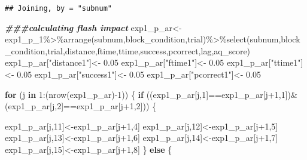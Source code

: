 \documentclass[
]{article}
\newenvironment{Shaded}{\begin{snugshade}}{\end{snugshade}}
\newcommand{\ControlFlowTok}[1]{\textcolor[rgb]{0.13,0.29,0.53}{\textbf{#1}}}
\newcommand{\DecValTok}[1]{\textcolor[rgb]{0.00,0.00,0.81}{#1}}
\newcommand{\DocumentationTok}[1]{\textcolor[rgb]{0.56,0.35,0.01}{\textbf{\textit{#1}}}}
\newcommand{\FloatTok}[1]{\textcolor[rgb]{0.00,0.00,0.81}{#1}}
\newcommand{\FunctionTok}[1]{\textcolor[rgb]{0.00,0.00,0.00}{#1}}
\newcommand{\NormalTok}[1]{#1}
\newcommand{\OtherTok}[1]{\textcolor[rgb]{0.56,0.35,0.01}{#1}}
\newcommand{\SpecialCharTok}[1]{\textcolor[rgb]{0.00,0.00,0.00}{#1}}
\newcommand{\StringTok}[1]{\textcolor[rgb]{0.31,0.60,0.02}{#1}}
\begin{document}
\begin{verbatim}
## Joining, by = "subnum"
\end{verbatim}

\begin{Shaded}
\begin{Highlighting}[]
\DocumentationTok{\#\#\#calculating flash impact}
\NormalTok{exp1\_p\_ar}\OtherTok{\textless{}{-}}\NormalTok{exp1\_p\_1}\SpecialCharTok{\%\textgreater{}\%}\FunctionTok{arrange}\NormalTok{(subnum,block\_condition,trial)}\SpecialCharTok{\%\textgreater{}\%}\FunctionTok{select}\NormalTok{(subnum,block\_condition,trial,distance,ftime,ttime,success,pcorrect,lag,aq\_score)}
\NormalTok{exp1\_p\_ar[}\StringTok{"distance1"}\NormalTok{]}\OtherTok{\textless{}{-}} \FloatTok{0.05}
\NormalTok{exp1\_p\_ar[}\StringTok{"ftime1"}\NormalTok{]}\OtherTok{\textless{}{-}} \FloatTok{0.05}
\NormalTok{exp1\_p\_ar[}\StringTok{"ttime1"}\NormalTok{]}\OtherTok{\textless{}{-}} \FloatTok{0.05}
\NormalTok{exp1\_p\_ar[}\StringTok{"success1"}\NormalTok{]}\OtherTok{\textless{}{-}} \FloatTok{0.05}
\NormalTok{exp1\_p\_ar[}\StringTok{"pcorrect1"}\NormalTok{]}\OtherTok{\textless{}{-}} \FloatTok{0.05}



\ControlFlowTok{for}\NormalTok{ (j }\ControlFlowTok{in} \DecValTok{1}\SpecialCharTok{:}\NormalTok{(}\FunctionTok{nrow}\NormalTok{(exp1\_p\_ar)}\SpecialCharTok{{-}}\DecValTok{1}\NormalTok{))}
\NormalTok{\{}
  \ControlFlowTok{if}\NormalTok{ ((exp1\_p\_ar[j,}\DecValTok{1}\NormalTok{]}\SpecialCharTok{==}\NormalTok{exp1\_p\_ar[j}\SpecialCharTok{+}\DecValTok{1}\NormalTok{,}\DecValTok{1}\NormalTok{])}\SpecialCharTok{\&}\NormalTok{(exp1\_p\_ar[j,}\DecValTok{2}\NormalTok{]}\SpecialCharTok{==}\NormalTok{exp1\_p\_ar[j}\SpecialCharTok{+}\DecValTok{1}\NormalTok{,}\DecValTok{2}\NormalTok{]))}
\NormalTok{  \{  }
    
\NormalTok{    exp1\_p\_ar[j,}\DecValTok{11}\NormalTok{]}\OtherTok{\textless{}{-}}\NormalTok{exp1\_p\_ar[j}\SpecialCharTok{+}\DecValTok{1}\NormalTok{,}\DecValTok{4}\NormalTok{]}
\NormalTok{    exp1\_p\_ar[j,}\DecValTok{12}\NormalTok{]}\OtherTok{\textless{}{-}}\NormalTok{exp1\_p\_ar[j}\SpecialCharTok{+}\DecValTok{1}\NormalTok{,}\DecValTok{5}\NormalTok{]}
\NormalTok{    exp1\_p\_ar[j,}\DecValTok{13}\NormalTok{]}\OtherTok{\textless{}{-}}\NormalTok{exp1\_p\_ar[j}\SpecialCharTok{+}\DecValTok{1}\NormalTok{,}\DecValTok{6}\NormalTok{]}
\NormalTok{    exp1\_p\_ar[j,}\DecValTok{14}\NormalTok{]}\OtherTok{\textless{}{-}}\NormalTok{exp1\_p\_ar[j}\SpecialCharTok{+}\DecValTok{1}\NormalTok{,}\DecValTok{7}\NormalTok{]}
\NormalTok{    exp1\_p\_ar[j,}\DecValTok{15}\NormalTok{]}\OtherTok{\textless{}{-}}\NormalTok{exp1\_p\_ar[j}\SpecialCharTok{+}\DecValTok{1}\NormalTok{,}\DecValTok{8}\NormalTok{]}
\NormalTok{  \}}
  \ControlFlowTok{else}
\NormalTok{  \{}
    

\end{Highlighting}
\end{Shaded}
\end{document}
